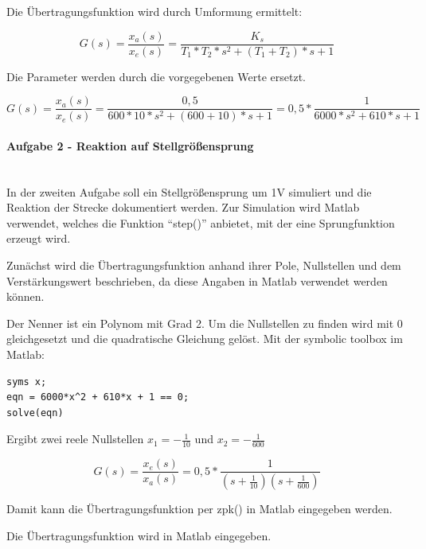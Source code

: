 \documentclass[            %
draft = false,             		%
paper = A4,                		%
pagesize = pdftex,         		%
fontsize = 10pt,           		%
DIV=15,                    		%
twoside = false,           		%
twocolumn = false,         		%
parskip = full,           		%
chapterprefix = false,      		%
appendixprefix = true,     		%
headinclude = false,       		%
footinclude = false,       		%
mpinclude = false,         		%
numbers = auto,            		%
cleardoublepage = plain,   		%
footnotes = multiple,      		%
titlepage = true,          		%
headings = normal,         		%
open = right,              		%
bibliography = openstyle,  		%
listof = chaptergapline,   		%
overfullrule = true,
]{scrbook}
\begin{document}
Die Übertragungsfunktion wird durch Umformung ermittelt:

\begin{equation}
G(s) = \frac{x_a(s)}{x_e(s)} = \frac{K_s}{T_1*T_2*s^2 + (T_1 + T_2)*s + 1}
\end{equation}

Die Parameter werden durch die vorgegebenen Werte ersetzt. 

\begin{equation}
G(s) = \frac{x_a(s)}{x_e(s)} = \frac{0,5}{600*10*s^2 + (600 + 10)*s + 1} = 0,5*\frac{1}{6000*s^2 + 610*s + 1}
\end{equation}








\paragraph{Aufgabe 2 - Reaktion auf Stellgrößensprung}~\\

In der zweiten Aufgabe soll ein Stellgrößensprung um 1V simuliert und die Reaktion der Strecke dokumentiert werden.
Zur Simulation wird Matlab verwendet, welches die Funktion ``step()'' anbietet, mit der eine Sprungfunktion erzeugt wird.

Zunächst wird die Übertragungsfunktion anhand ihrer Pole, Nullstellen und dem Verstärkungswert beschrieben, da diese Angaben in
Matlab verwendet werden können.

Der Nenner ist ein Polynom mit Grad 2. Um die Nullstellen zu finden wird mit 0 gleichgesetzt und die quadratische Gleichung gelöst.
Mit der symbolic toolbox im Matlab:

\begin{lstlisting}[style=CStyle]
syms x;
eqn = 6000*x^2 + 610*x + 1 == 0;
solve(eqn)
\end{lstlisting}

Ergibt zwei reele Nullstellen $x_1 = - \frac{1}{10}$ und $x_2 = - \frac{1}{600}$

\begin{equation}
G(s) = \frac{x_e(s)}{x_a(s)} = 0,5*\frac{1}{(s + \frac{1}{10})(s + \frac{1}{600})}
\end{equation}

Damit kann die Übertragungsfunktion per zpk() in Matlab eingegeben werden.

Die Übertragungsfunktion wird in Matlab eingegeben.
\end{document}
